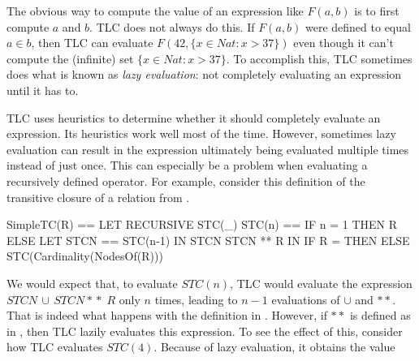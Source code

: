 \documentclass[fleqn,leqno]{article}
\begin{document}
The obvious way to compute the value of an expression like $F(a, b)$
is to first compute $a$ and $b$.  TLC does not always do this.  If
$F(a, b)$ were defined to equal $a \in b$, then TLC can evaluate
  $ F(42, \{x \in Nat : x > 37 \}) $
even though it can't compute the (infinite) set 
  $\{x \in Nat : x > 37 \}$.
To accomplish this, TLC sometimes does what is known as \emph{lazy
evaluation}: not completely evaluating an expression until it has to.



TLC uses heuristics to determine whether it should completely evaluate
an expression.  Its heuristics work well most of the time.  However,
sometimes lazy evaluation can result in the expression ultimately
being evaluated multiple times instead of just once.  This can
especially be a problem when evaluating a recursively defined
operator.  For example, consider this definition of the 
transitive closure of a relation from 
  .
\begin{display}
\begin{notla}
SimpleTC(R) ==
  LET RECURSIVE STC(_)
      STC(n) == IF n = 1 THEN R
                         ELSE LET STCN == STC(n-1)
                              IN STCN  \cup  STCN **  R
  IN IF R = {} THEN {} ELSE STC(Cardinality(NodesOf(R)))
\end{notla}
\begin{tlatex}
%
%
%
%
\end{tlatex}
\end{display}
We would expect that, to evaluate $STC(n)$, TLC would evaluate the
expression $STCN \,\cup\, STCN *\!*\; R$ only $n$ times, leading to $n-1$
evaluations of $\cup$ and $**$.  That is indeed what happens
with the definition in 
    .
However, if $**$ is defined as in 
    ,
then TLC lazily evaluates this expression.  To see the effect of
this, consider how TLC evaluates $STC(4)$.  Because of lazy
evaluation, it obtains the value
\end{document}
